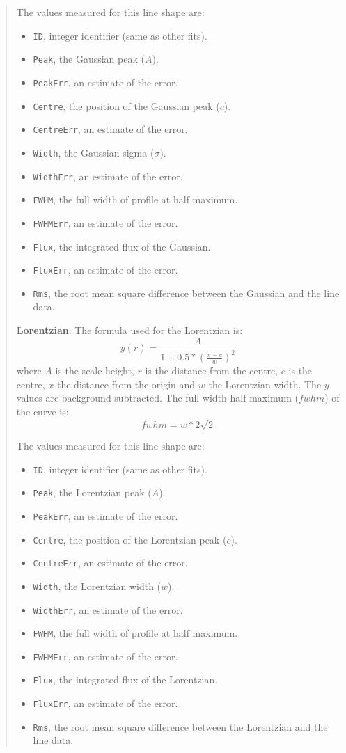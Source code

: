 \documentclass[twoside,11pt]{article}
\renewcommand{\_}{\texttt{\symbol{95}}}
\newcommand{\labelitem}[1]{\textbf{#1}}
\newcommand{\hitext}[1]{\texttt{#1}}
\begin{document}
\begin{quote}
 The values measured for this line shape are:
 \begin{itemize}
   \item \hitext{ID}, integer identifier (same as other fits).
   \item \hitext{Peak}, the Gaussian peak ($A$).
   \item \hitext{PeakErr}, an estimate of the error.
   \item \hitext{Centre}, the position of the Gaussian peak ($c$).
   \item \hitext{CentreErr}, an estimate of the error.
   \item \hitext{Width}, the Gaussian sigma ($\sigma$).
   \item \hitext{WidthErr}, an estimate of the error.
   \item \hitext{FWHM}, the full width of profile at half maximum.
   \item \hitext{FWHMErr}, an estimate of the error.
   \item \hitext{Flux}, the integrated flux of the Gaussian.
   \item \hitext{FluxErr}, an estimate of the error.
   \item \hitext{Rms}, the root mean square difference between the
         Gaussian and the line data.
 \end{itemize}

 \labelitem{Lorentzian}: The formula used for the Lorentzian is:
 \[
  y(r) = \frac{A}{1+0.5*(\frac{x-c}{w})^{2}}
 \]
 where $A$ is the scale height, $r$ is the distance from the centre,
 $c$ is the centre, $x$ the distance from the origin and $w$ the
 Lorentzian width. The $y$ values are background subtracted. The full
 width half maximum ($fwhm$) of the curve is:
 \[
 fwhm = w*2\sqrt{2}
 \]

 The values measured for this line shape are:
 \begin{itemize}
   \item \hitext{ID}, integer identifier (same as other fits).
   \item \hitext{Peak}, the Lorentzian peak ($A$).
   \item \hitext{PeakErr}, an estimate of the error.
   \item \hitext{Centre}, the position of the Lorentzian peak ($c$).
   \item \hitext{CentreErr}, an estimate of the error.
   \item \hitext{Width}, the Lorentzian width ($w$).
   \item \hitext{WidthErr}, an estimate of the error.
   \item \hitext{FWHM}, the full width of profile at half maximum.
   \item \hitext{FWHMErr}, an estimate of the error.
   \item \hitext{Flux}, the integrated flux of the Lorentzian.
   \item \hitext{FluxErr}, an estimate of the error.
   \item \hitext{Rms}, the root mean square difference between the
         Lorentzian and the line data.
 \end{itemize}


\end{quote}
\end{document}
